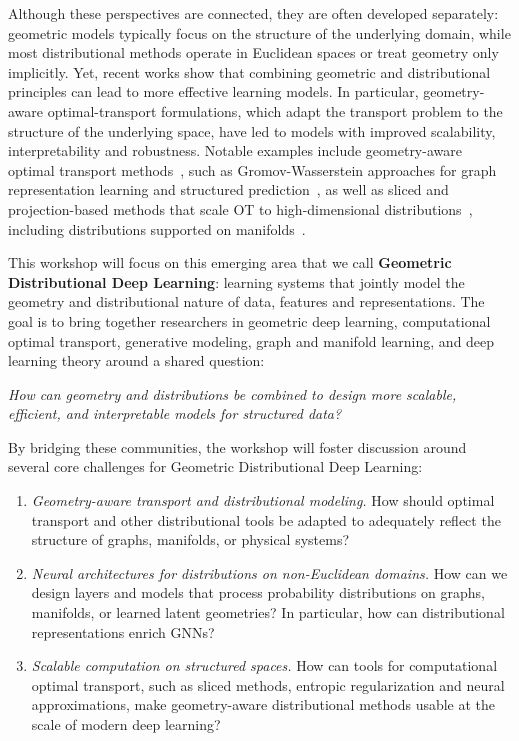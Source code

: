 \documentclass{article}
\begin{document}
Although these perspectives are connected, they are often developed separately: geometric models typically focus on the structure of the underlying domain, while most distributional methods operate in Euclidean spaces or treat geometry only implicitly. Yet, recent works show that combining geometric and distributional principles can lead to more effective learning models. In particular, geometry-aware optimal-transport formulations, which adapt the transport problem to the structure of the underlying space, have led to models with improved scalability, interpretability and robustness. Notable examples include geometry-aware optimal transport methods~\citep{scarvelis2023riemannian}, such as Gromov-Wasserstein approaches for graph representation learning and structured prediction~\citep{peyre2016gromov,titouan2019optimal,vincent2021online,vincentcuaz2022template,brogat2022learning,krzakala2024any2graph}, as well as sliced and projection-based methods that scale OT to high-dimensional distributions~\citep{rabin2012wasserstein,bonneel2015sliced,nadjahi2020statistical}, including distributions supported on manifolds~\citep{kolouri2019generalized,nguyen2020distributional,bonet2022spherical,bonet2024sliced}.

This workshop will focus on this emerging area that we call \textbf{Geometric Distributional Deep Learning}: learning systems that jointly model the geometry and distributional nature of data, features and representations. The goal is to bring together researchers in geometric deep learning, computational optimal transport, generative modeling, graph and manifold learning, and deep learning theory around a shared question:
\begin{center}
\emph{How can geometry and distributions be combined to design more scalable, efficient, and interpretable models for structured data?}
\end{center}

By bridging these communities, the workshop will foster discussion around several core challenges for Geometric Distributional Deep Learning:
\begin{enumerate}
\item \emph{Geometry-aware transport and distributional modeling.} How should optimal transport and other distributional tools be adapted to adequately reflect the structure of graphs, manifolds, or physical systems?
\item \emph{Neural architectures for distributions on non-Euclidean domains.} How can we design layers and models that process probability distributions on graphs, manifolds, or learned latent geometries? In particular, how can distributional representations enrich GNNs? 
\item \emph{Scalable computation on structured spaces.} How can tools for computational optimal transport, such as sliced methods, entropic regularization and neural approximations, make geometry-aware distributional methods usable at the scale of modern deep learning?
\end{enumerate}
\end{document}
